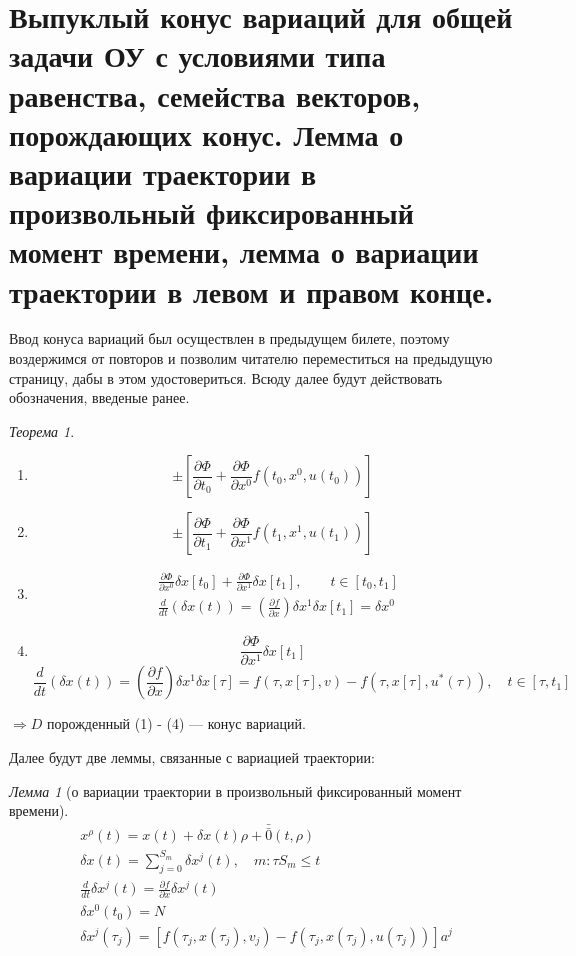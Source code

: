 \documentclass[oneside, final, 14pt, draft]{article}
\theoremstyle{definition}
\theoremstyle{definition}
\theoremstyle{remark}
\theoremstyle{theorem}
\newtheorem{thm}{Теорема}[section]
\newtheorem{lem}{Лемма}[section]
\renewcommand{\leq}{\leqslant}
\begin{document}
\section{Выпуклый конус вариаций для общей задачи ОУ с условиями типа равенства, семейства векторов, порождающих конус. Лемма о вариации траектории в произвольный фиксированный момент времени, лемма о вариации траектории в левом и правом конце.}
Ввод конуса вариаций был осуществлен в предыдущем билете, поэтому воздержимся от повторов и позволим читателю переместиться на предыдущую страницу, дабы в этом удостовериться. Всюду далее будут действовать обозначения, введеные ранее.
\begin{thm}\ \\
\begin{enumerate}
\item $$\pm \left[ \frac{\partial \Phi}{\partial t_0} + \frac{\partial \Phi}{\partial x^0} f(t_0, x^0, u(t_0))\right]$$ 
\item $$\pm \left[ \frac{\partial \Phi}{\partial t_1} + \frac{\partial \Phi}{\partial x^1} f(t_1, x^1, u(t_1))\right]$$
\item \begin{align*}
&\frac{\partial \Phi}{\partial x^0}\delta x[t_0] + \frac{\partial \Phi}{\partial x^1} \delta x[t_1], \qquad t\in[t_0, t_1]\\
&\frac{d}{dt}\left(\delta x(t)\right) = \left( \frac{\partial f}{\partial x}\right) \delta x^1 \delta x[t_1]=\delta x^0
\end{align*}
\item
$$\frac{\partial \Phi}{\partial x^1} \delta x[t_1]$$
$$\frac{d}{dt}\left(\delta x(t)\right) = \left( \frac{\partial f}{\partial x}\right) \delta x^1 \delta x[\tau] = f(\tau, x[\tau], v) - f\left(\tau, x[\tau], u^*(\tau)\right), \quad t \in [\tau, t_1]$$
\end{enumerate}
$\Rightarrow D$ порожденный (1) - (4) --- конус вариаций.
\label{conus}
\end{thm}

{\flushleft Далее будут две леммы, связанные с вариацией траектории:}

\begin{lem}[о вариации траектории в произвольный фиксированный момент времени]\ \\
\begin{align*}
&x^{\rho}(t) = x(t) + \delta x(t)\rho + \bar{\bar{0}}(t, \rho)\\
&\delta x(t) = \sum\limits_{j=0}^{S_m} \delta x^j(t), \quad m: \tau{S_m} \leq t\\
&\frac{d}{dt}\delta x^j(t) = \frac{\partial f}{\partial x}\delta x^j(t)\\
&\delta x^0(t_0) = N\\
&\delta x^j(\tau_j) = [f(\tau_j, x(\tau_j), v_j) - f(\tau_j, x(\tau_j), u(\tau_j))]a^j
\end{align*}
\end{lem}
\end{document}
